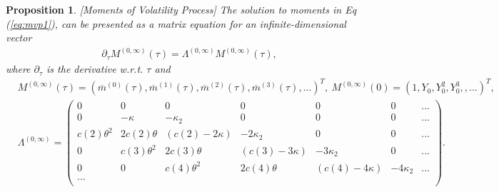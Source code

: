 \documentclass[11pt,a4paper] {article}
\newtheorem{proposition}{Proposition}[section]
\begin{document}
\begin{proposition}\label{pr:vol_moments}  [Moments of Volatility Process]
The solution to moments in Eq (\ref{eq:mvp1}), can be presented as a matrix equation for an infinite-dimensional vector
\begin{equation} \label {eq:mvp5}
\begin{split}
&\partial_{\tau}M^{(0,\infty)}(\tau) =\Lambda^{(0,\infty)} M^{(0,\infty)}(\tau),
\end{split}
\end{equation}
where $\partial_{\tau}$ is the derivative w.r.t. $\tau$ and
\begin{equation*}
\begin{split}
& M^{(0,\infty)} (\tau) = \left(\overline{m}^{(0)}(\tau),\overline{m}^{(1)}(\tau),\overline{m}^{(2)}(\tau),\overline{m}^{(3)}(\tau),...
\right)^{T}, \ 
M^{(0,\infty)} (0) =  \left( 1, Y_{0}, Y^{2}_{0}, Y^{3}_{0}, ,... \right)^{T},\\
&\Lambda^{(0,\infty)} = \begin{pmatrix}
0 & 0 & 0 & 0 & 0& 0& ...\\
0 & -\kappa  & -\kappa_{2}  &  0 & 0& 0& ...\\
c(2)\theta^{2} & 2c(2)\theta & (c(2)-  2 \kappa) &  - 2\kappa_{2} & 0& 0& ...\\
0 & c(3)\theta^{2} & 2c(3)\theta & (c(3)- 3\kappa) &  - 3\kappa_{2} & 0& ...\\
0 & 0 &  c(4)\theta^{2} & 2c(4)\theta & (c(4)- 4\kappa) &  - 4\kappa_{2} & ...\\
...\\
\end{pmatrix}.
\end{split}
\end{equation*}


\end{proposition}
\end{document}
